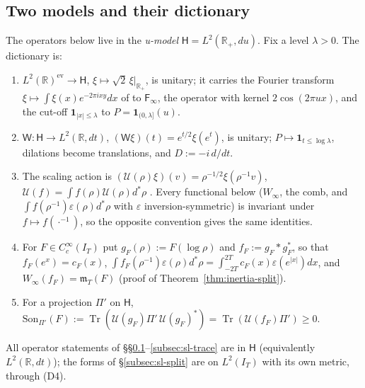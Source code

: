 \documentclass[11pt]{amsart}
\theoremstyle{definition}
\theoremstyle{remark}
\newcommand{\R}{\mathbb R}
\newcommand{\IT}{I_T}
\newcommand{\cF}{c_F}
\newcommand{\mT}{\mathfrak m_T}
\begin{document}
\subsection{Two models and their dictionary}\label{subsec:sl-dict}
The operators below live in the \emph{u-model} $\mathsf H=L^2(\R_+,du)$. Fix a level $\lambda>0$. The dictionary is:
\begin{enumerate}
\item[(D1)] $L^2(\R)^{\mathrm{ev}}\to\mathsf H$, $\xi\mapsto\sqrt2\,\xi|_{\R_+}$, is unitary; it carries the Fourier transform
$\xi\mapsto\int\xi(x)e^{-2\pi ixy}dx$ of \cite{ConnesConsani2021} to $\mathsf F_\infty$, the operator with kernel
$2\cos(2\pi ux)$, and the cut-off $\mathbf 1_{|x|\le\lambda}$ to $P=\mathbf 1_{(0,\lambda]}(u)$.
\item[(D2)] $\mathsf W:\mathsf H\to L^2(\R,dt)$, $(\mathsf W\xi)(t)=e^{t/2}\xi(e^t)$, is unitary; $P\mapsto\mathbf 1_{t\le\log\lambda}$,
dilations become translations, and $D:=-i\,d/dt$.
\item[(D3)] The scaling action is $(\mathcal U(\rho)\xi)(v)=\rho^{-1/2}\xi(\rho^{-1}v)$, $\mathcal U(f)=\int f(\rho)\mathcal U(\rho)d^*\rho$
\cite[(61)]{ConnesConsani2021}. Every functional below ($W_\infty$, the comb, and $\int f(\rho^{-1})\varepsilon(\rho)d^*\rho$ with
$\varepsilon$ inversion-symmetric) is invariant under $f\mapsto f(\cdot^{-1})$, so the opposite convention gives the same
identities.
\item[(D4)] For $F\in C_c^\infty(\IT)$ put $g_F(\rho):=F(\log\rho)$ and $f_F:=g_F*g_F^*$, so that $f_F(e^x)=\cF(x)$,
$\int f_F(\rho^{-1})\varepsilon(\rho)d^*\rho=\int_{-2T}^{2T}\cF(x)\varepsilon(e^{|x|})dx$, and $W_\infty(f_F)=\mT(F)$ (proof of
Theorem~\ref{thm:inertia-split}).
\item[(D5)] For a projection $\Pi'$ on $\mathsf H$, $\mathrm{Son}_{\Pi'}(F):=\operatorname{Tr}(\mathcal U(g_F)\Pi'\,\mathcal U(g_F)^*)
=\operatorname{Tr}(\mathcal U(f_F)\Pi')\ge0$.
\end{enumerate}
All operator statements of \S\S\ref{subsec:sl-dict}--\ref{subsec:sl-trace} are in $\mathsf H$ (equivalently $L^2(\R,dt)$);
the forms of \S\ref{subsec:sl-split} are on $L^2(\IT)$ with its own metric, through (D4).
\end{document}
